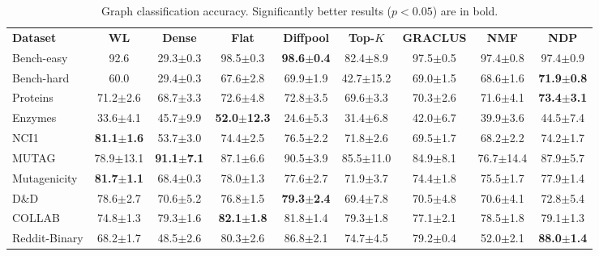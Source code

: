\documentclass[journal]{IEEEtran}
\renewcommand{\t}[1]{\tiny{#1}}
\begin{document}
\bgroup
\def\arraystretch{1} \setlength\tabcolsep{1em} \begin{table*}[!ht]
\footnotesize
\centering
\caption{Graph classification accuracy. Significantly better results ($p < 0.05$) are in bold.} 
\label{tab:graph_class}
\begin{tabular}{lcccccccc}
\cmidrule[1.5pt]{1-9}
\textbf{Dataset} & \textbf{WL} & \textbf{Dense} & \textbf{Flat} & \textbf{Diffpool} & \textbf{Top-$K$}  & \textbf{GRACLUS} & \textbf{NMF} & \textbf{NDP}\\
\cmidrule[.5pt]{1-9}
Bench-easy    & 92.6 & 29.3\t{$\pm$0.3} & 98.5\t{$\pm$0.3} & \textbf{98.6\t{$\pm$0.4}} & 82.4\t{$\pm$8.9} & 97.5\t{$\pm$0.5} & 97.4\t{$\pm$0.8} & 97.4\t{$\pm$0.9}\\ Bench-hard    & 60.0 & 29.4\t{$\pm$0.3} & 67.6\t{$\pm$2.8} & 69.9\t{$\pm$1.9} & 42.7\t{$\pm$15.2}  & 69.0\t{$\pm$1.5} & 68.6\t{$\pm$1.6} & \textbf{71.9\t{$\pm$0.8}}\\  Proteins      & 71.2\t{$\pm$2.6}  & 68.7\t{$\pm$3.3} & 72.6\t{$\pm$4.8} & 72.8\t{$\pm$3.5} & 69.6\t{$\pm$3.3} & 70.3\t{$\pm$2.6} & 71.6\t{$\pm$4.1} & \textbf{73.4\t{$\pm$3.1}}\\ Enzymes       & 33.6\t{$\pm$4.1}  & 45.7\t{$\pm$9.9} & \textbf{52.0\t{$\pm$12.3}} & 24.6\t{$\pm$5.3} & 31.4\t{$\pm$6.8} & 42.0\t{$\pm$6.7} & 39.9\t{$\pm$3.6} & 44.5\t{$\pm$7.4}\\ NCI1          & \textbf{81.1\t{$\pm$1.6}}  & 53.7\t{$\pm$3.0} & 74.4\t{$\pm$2.5} & 76.5\t{$\pm$2.2} & 71.8\t{$\pm$2.6} & 69.5\t{$\pm$1.7} & 68.2\t{$\pm$2.2} & 74.2\t{$\pm$1.7}\\ MUTAG         & 78.9\t{$\pm$13.1} & \textbf{91.1\t{$\pm$7.1}} & 87.1\t{$\pm$6.6} & 90.5\t{$\pm$3.9} & 85.5\t{$\pm$11.0} & 84.9\t{$\pm$8.1} & 76.7\t{$\pm$14.4} & 87.9\t{$\pm$5.7}\\ Mutagenicity  & \textbf{81.7\t{$\pm$1.1}}  & 68.4\t{$\pm$0.3} & 78.0\t{$\pm$1.3} & 77.6\t{$\pm$2.7} & 71.9\t{$\pm$3.7} & 74.4\t{$\pm$1.8} & 75.5\t{$\pm$1.7} & 77.9\t{$\pm$1.4}\\ D\&D          & 78.6\t{$\pm$2.7}  & 70.6\t{$\pm$5.2} & 76.8\t{$\pm$1.5} & \textbf{79.3\t{$\pm$2.4}} & 69.4\t{$\pm$7.8} & 70.5\t{$\pm$4.8} & 70.6\t{$\pm$4.1} & 72.8\t{$\pm$5.4}\\ COLLAB        & 74.8\t{$\pm$1.3}  & 79.3\t{$\pm$1.6} & \textbf{82.1\t{$\pm$1.8}} & 81.8\t{$\pm$1.4} & 79.3\t{$\pm$1.8} & 77.1\t{$\pm$2.1} & 78.5\t{$\pm$1.8} & 79.1\t{$\pm$1.3} \\ Reddit-Binary & 68.2\t{$\pm$1.7}  & 48.5\t{$\pm$2.6} & 80.3\t{$\pm$2.6} & 86.8\t{$\pm$2.1} & 74.7\t{$\pm$4.5} & 79.2\t{$\pm$0.4} & 52.0\t{$\pm$2.1} & \textbf{88.0\t{$\pm$1.4}} \\ \cmidrule[1.5pt]{1-9}
\end{tabular}
\end{table*}
\egroup
\end{document}
